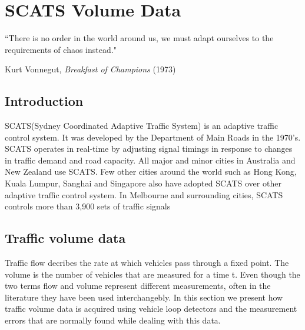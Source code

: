 
\chapter{SCATS Volume Data} %

\label{Chapter3}


``There is no order in the world around us, we must adapt ourselves to the requirements of chaos
instead."

\begin{flushright}
Kurt Vonnegut, \textit{Breakfast of Champions} (1973)
\end{flushright}

\section{Introduction}
SCATS(Sydney Coordinated Adaptive Traffic System) is an adaptive traffic control system. It was
developed by the Department of Main Roads in the 1970's. SCATS operates in real-time by adjusting
signal timings in response to changes in traffic demand and road capacity. All major and minor
cities in Australia and New Zealand use SCATS. Few other cities around the world such as Hong
Kong, Kuala Lumpur, Sanghai and Singapore also have adopted SCATS over other adaptive traffic
control system. In Melbourne and surrounding cities, SCATS controls more than 3,900 sets of traffic
signals


\section{Traffic volume data}
Traffic flow decribes the rate at which vehicles pass through a fixed point. The volume is the number
of vehicles that are measured for a time t. Even though the two terms flow and volume represent different
measurements, often in the literature they have been used interchangebly. In this section we present
how traffic volume data is acquired using vehicle loop detectors and the measurement errors that are
normally found while dealing with this data.

